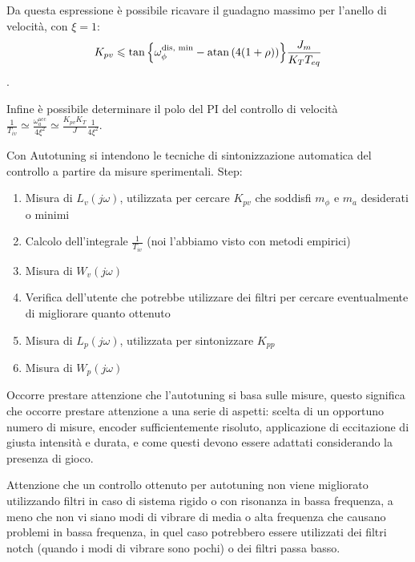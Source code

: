 Da questa espressione è possibile ricavare il guadagno massimo per l'anello di velocità, con \(\xi=1\): \[K_{pv} \leqslant \tan{\left\{\omega_\phi^\text{dis, min} - \operatorname{atan}\left( 4(1+\rho) \right) \right\}}\frac{J_m}{K_T T_{eq}} \].

Infine è possibile determinare il polo del PI del controllo di velocità \(\frac{1}{T_{iv}} \simeq \frac{\omega_a^\text{acc}}{4\xi^2} \simeq \frac{K_{pv}K_T}{J} \frac{1}{4\xi^2} \).

Con Autotuning si intendono le tecniche di sintonizzazione automatica del controllo a partire da misure sperimentali.
Step:
\begin{enumerate}
    \item Misura di \(L_v(j\omega)\), utilizzata per cercare \(K_{pv}\) che soddisfi \(m_\phi\) e \(m_a\) desiderati o minimi
    \item Calcolo dell'integrale \(\frac{1}{T_{iv}}\) (noi l'abbiamo visto con metodi empirici)
    \item Misura di \(W_v(j\omega)\)
    \item Verifica dell'utente che potrebbe utilizzare dei filtri per cercare eventualmente di migliorare quanto ottenuto
    \item Misura di \(L_p(j\omega)\), utilizzata per sintonizzare \(K_{pp}\)
    \item Misura di \(W_p(j\omega)\)
\end{enumerate}

Occorre prestare attenzione che l'autotuning si basa sulle misure, questo significa che occorre prestare attenzione a una serie di aspetti: scelta di un opportuno numero di misure, encoder sufficientemente risoluto, applicazione di eccitazione di giusta intensità e durata, e come questi devono essere adattati considerando la presenza di gioco.

Attenzione che un controllo ottenuto per autotuning non viene migliorato utilizzando filtri in caso di sistema rigido o con risonanza in bassa frequenza, a meno che non vi siano modi di vibrare di media o alta frequenza che causano problemi in bassa frequenza, in quel caso potrebbero essere utilizzati dei filtri notch (quando i modi di vibrare sono pochi) o dei filtri passa basso.